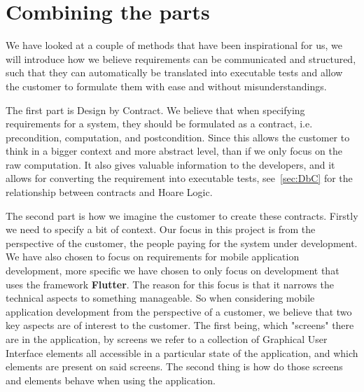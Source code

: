 \section{Combining the parts}\label{sec:combiningtheparts}
We have looked at a couple of methods that have been inspirational for us, we will introduce how we believe requirements can be communicated and structured, such that they can automatically be translated into executable tests and allow the customer to formulate them with ease and without misunderstandings.

The first part is Design by Contract.
We believe that when specifying requirements for a system, they should be formulated as a contract, i.e. precondition, computation, and postcondition. 
Since this allows the customer to think in a bigger context and more abstract level, than if we only focus on the raw computation.
It also gives valuable information to the developers, and it allows for converting the requirement into executable tests, see~\autoref{sec:DbC} for the relationship between contracts and Hoare Logic.

The second part is how we imagine the customer to create these contracts.
Firstly we need to specify a bit of context.
Our focus in this project is from the perspective of the customer, the people paying for the system under development.
We have also chosen to focus on requirements for mobile application development, more specific we have chosen to only focus on development that uses the framework \textbf{Flutter}.
The reason for this focus is that it narrows the technical aspects to something manageable.
So when considering mobile application development from the perspective of a customer, we believe that two key aspects are of interest to the customer.
The first being, which "screens" there are in the application, by screens we refer to a collection of Graphical User Interface elements all accessible in a particular state of the application, and which elements are present on said screens.
The second thing is how do those screens and elements behave when using the application.

